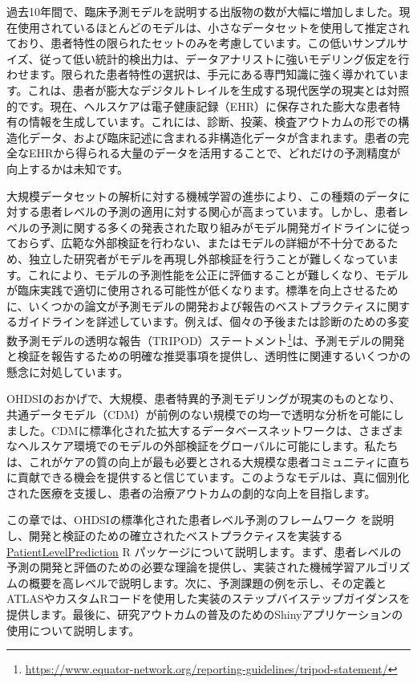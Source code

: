 \documentclass[
  11pt]{book}
\theoremstyle{definition}
\theoremstyle{definition}
\theoremstyle{definition}
\theoremstyle{definition}
\theoremstyle{remark}
\begin{document}
過去10年間で、臨床予測モデルを説明する出版物の数が大幅に増加しました。現在使用されているほとんどのモデルは、小さなデータセットを使用して推定されており、患者特性の限られたセットのみを考慮しています。この低いサンプルサイズ、従って低い統計的検出力は、データアナリストに強いモデリング仮定を行わせます。限られた患者特性の選択は、手元にある専門知識に強く導かれています。これは、患者が膨大なデジタルトレイルを生成する現代医学の現実とは対照的です。現在、ヘルスケアは電子健康記録（EHR）に保存された膨大な患者特有の情報を生成しています。これには、診断、投薬、検査アウトカムの形での構造化データ、および臨床記述に含まれる非構造化データが含まれます。患者の完全なEHRから得られる大量のデータを活用することで、どれだけの予測精度が向上するかは未知です。 

大規模データセットの解析に対する機械学習の進歩により、この種類のデータに対する患者レベルの予測の適用に対する関心が高まっています。しかし、患者レベルの予測に関する多くの発表された取り組みがモデル開発ガイドラインに従っておらず、広範な外部検証を行わない、またはモデルの詳細が不十分であるため、独立した研究者がモデルを再現し外部検証を行うことが難しくなっています。これにより、モデルの予測性能を公正に評価することが難しくなり、モデルが臨床実践で適切に使用される可能性が低くなります。標準を向上させるために、いくつかの論文が予測モデルの開発および報告のベストプラクティスに関するガイドラインを詳述しています。例えば、個々の予後または診断のための多変数予測モデルの透明な報告（TRIPOD）ステートメント\footnote{\url{https://www.equator-network.org/reporting-guidelines/tripod-statement/}}は、予測モデルの開発と検証を報告するための明確な推奨事項を提供し、透明性に関連するいくつかの懸念に対処しています。  

OHDSIのおかげで、大規模、患者特異的予測モデリングが現実のものとなり、共通データモデル（CDM）が前例のない規模での均一で透明な分析を可能にしました。CDMに標準化された拡大するデータベースネットワークは、さまざまなヘルスケア環境でのモデルの外部検証をグローバルに可能にします。私たちは、これがケアの質の向上が最も必要とされる大規模な患者コミュニティに直ちに貢献できる機会を提供すると信じています。このようなモデルは、真に個別化された医療を支援し、患者の治療アウトカムの劇的な向上を目指します。

この章では、OHDSIの標準化された患者レベル予測のフレームワーク \citep[ ]{reps2018}を説明し、開発と検証のための確立されたベストプラクティスを実装する \href{https://ohdsi.github.io/PatientLevelPrediction/}{PatientLevelPrediction} R パッケージについて説明します。まず、患者レベルの予測の開発と評価のための必要な理論を提供し、実装された機械学習アルゴリズムの概要を高レベルで説明します。次に、予測課題の例を示し、その定義とATLASやカスタムRコードを使用した実装のステップバイステップガイダンスを提供します。最後に、研究アウトカムの普及のためのShinyアプリケーションの使用について説明します。
\end{document}
